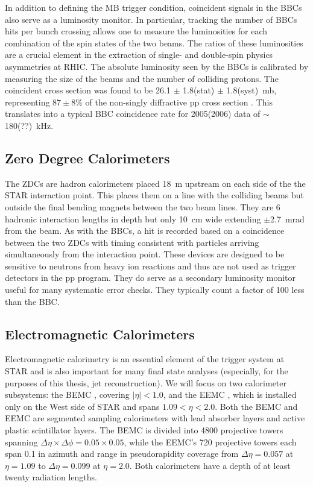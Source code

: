 In addition to defining the MB trigger condition, coincident signals in the
BBCs also serve as a luminosity monitor. In particular, tracking the number of
BBCs hits per bunch crossing allows one to measure the luminosities for each
combination of the spin states of the two beams. The ratios of these
luminosities are a crucial element in the extraction of single- and
double-spin physics asymmetries at RHIC. The absolute luminosity seen by the
BBCs is calibrated by measuring the size of the beams and the number of
colliding protons. The coincident cross section was found to be 26.1 $\pm$
1.8(stat) $\pm$ 1.8(syst)~mb, representing $87\pm8\%$ of the non-singly
diffractive pp cross section \cite{Adams:2003kv}. This translates into a
typical BBC coincidence rate for 2005(2006) data of $\sim$180(??)~kHz.

\subsection{Zero Degree Calorimeters}

The ZDCs \cite{Adler:2003sp} are hadron calorimeters placed 18~m upstream on
each side of the the STAR interaction point. This places them on a line with
the colliding beams but outside the final bending magnets between the two beam
lines. They are 6 hadronic interaction lengths in depth but only 10~cm wide
extending $\pm$2.7~mrad from the beam. As with the BBCs, a hit is recorded
based on a coincidence between the two ZDCs with timing consistent with
particles arriving simultaneously from the interaction point. These devices
are designed to be sensitive to neutrons from heavy ion reactions and thus are
not used as trigger detectors in the pp program. They do serve as a secondary
luminosity monitor useful for many systematic error checks. They typically
count a factor of 100 less than the BBC.

\subsection{Electromagnetic Calorimeters}

Electromagnetic calorimetry is an essential element of the trigger system at
STAR and is also important for many final state analyses (especially, for the
purposes of this thesis, jet reconstruction). We will focus on two calorimeter
subsystems: the BEMC \cite{Beddo:2002zx}, covering $|\eta| < 1.0$, and the
EEMC \cite{Allgower:2002zy}, which is installed only on the West side of STAR
and spans $1.09 < \eta < 2.0$. Both the BEMC and EEMC are segmented sampling
calorimeters with lead absorber layers and active plastic scintillator layers.
The BEMC is divided into 4800 projective towers spanning $\Delta \eta \times
\Delta \phi = 0.05 \times 0.05$, while the EEMC's 720 projective towers each
span 0.1 in azimuth and range in pseudorapidity coverage from $\Delta \eta =
0.057$ at $\eta = 1.09$ to $\Delta \eta = 0.099$ at $\eta = 2.0$. Both
calorimeters have a depth of at least twenty radiation lengths.

